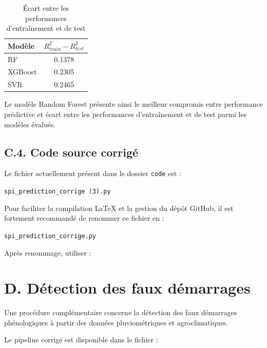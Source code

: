 \documentclass[12pt, a4paper, oneside, french]{report}
\begin{document}
\begin{table}[htbp]
\centering
\caption{Écart entre les performances d'entraînement et de test}
\begin{tabular}{lc}
\hline
Modèle & $R^2_{train}-R^2_{test}$ \\
\hline
RF & 0.1378 \\
XGBoost & 0.2305 \\
SVR & 0.2465 \\
\hline
\end{tabular}
\end{table}

Le modèle Random Forest présente ainsi le meilleur compromis entre
performance prédictive et écart entre les performances d'entraînement et de
test parmi les modèles évalués.

\subsection*{C.4. Code source corrigé}

Le fichier actuellement présent dans le dossier \texttt{code} est :

\begin{center}
\texttt{spi\_prediction\_corrige (3).py}
\end{center}

Pour faciliter la compilation LaTeX et la gestion du dépôt GitHub, il est
fortement recommandé de renommer ce fichier en :

\begin{center}
\texttt{spi\_prediction\_corrige.py}
\end{center}

Après renommage, utiliser :




\section*{D. Détection des faux démarrages}

Une procédure complémentaire concerne la détection des faux démarrages
phénologiques à partir des données pluviométriques et agroclimatiques.

Le pipeline corrigé est disponible dans le fichier :
\end{document}
